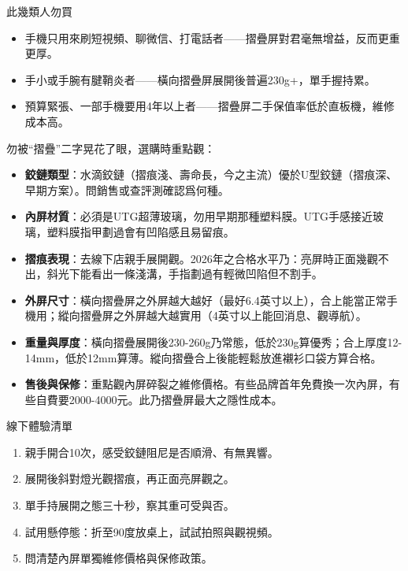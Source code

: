 \begin{tcbwarn}{此幾類人勿買}
\begin{itemize}
  \item 手機只用來刷短視頻、聊微信、打電話者——摺疊屏對君毫無增益，反而更重更厚。
  \item 手小或手腕有腱鞘炎者——橫向摺疊屏展開後普遍230g+，單手握持累。
  \item 預算緊張、一部手機要用4年以上者——摺疊屏二手保值率低於直板機，維修成本高。
\end{itemize}

\end{tcbwarn}


勿被“摺疊”二字晃花了眼，選購時重點觀：

\begin{itemize}
  \item \textbf{鉸鏈類型}：水滴鉸鏈（摺痕淺、壽命長，今之主流）優於U型鉸鏈（摺痕深、早期方案）。問銷售或查評測確認爲何種。
  \item \textbf{內屏材質}：必須是UTG超薄玻璃，勿用早期那種塑料膜。UTG手感接近玻璃，塑料膜指甲劃過會有凹陷感且易留痕。
  \item \textbf{摺痕表現}：去線下店親手展開觀。2026年之合格水平乃：亮屏時正面幾觀不出，斜光下能看出一條淺溝，手指劃過有輕微凹陷但不割手。
  \item \textbf{外屏尺寸}：橫向摺疊屏之外屏越大越好（最好6.4英寸以上），合上能當正常手機用；縱向摺疊屏之外屏越大越實用（4英寸以上能回消息、觀導航）。
  \item \textbf{重量與厚度}：橫向摺疊展開後230-260g乃常態，低於230g算優秀；合上厚度12-14mm，低於12mm算薄。縱向摺疊合上後能輕鬆放進襯衫口袋方算合格。
  \item \textbf{售後與保修}：重點觀內屏碎裂之維修價格。有些品牌首年免費換一次內屏，有些自費要2000-4000元。此乃摺疊屏最大之隱性成本。
\end{itemize}

\begin{tcbpractice}{線下體驗清單}
\begin{enumerate}
  \item 親手開合10次，感受鉸鏈阻尼是否順滑、有無異響。
  \item 展開後斜對燈光觀摺痕，再正面亮屏觀之。
  \item 單手持展開之態三十秒，察其重可受與否。
  \item 試用懸停態：折至90度放桌上，試試拍照與觀視頻。
  \item 問清楚內屏單獨維修價格與保修政策。
\end{enumerate}

\end{tcbpractice}

